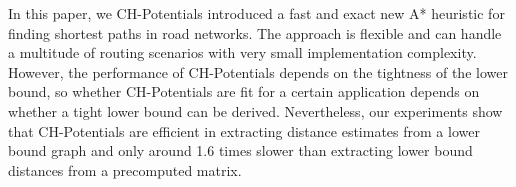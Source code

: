 \documentclass[letterpaper]{article} %
\begin{document}
In this paper, we CH-Potentials introduced a fast and exact new A* heuristic for finding shortest paths in road networks.
The approach is flexible and can handle a multitude of routing scenarios with very small implementation complexity.
However, the performance of CH-Potentials depends on the tightness of the lower bound, so whether CH-Potentials are fit for a certain application depends on whether a tight lower bound can be derived.
Nevertheless, our experiments show that CH-Potentials are efficient in extracting distance estimates from a lower bound graph and only around 1.6 times slower than extracting lower bound distances from a precomputed matrix.



\pagebreak



\end{document}

